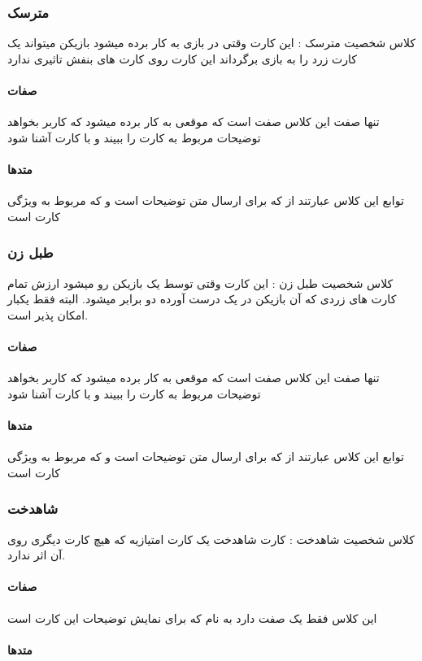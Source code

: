 \documentclass[pdf,titlepage,a4paper]{report}
\begin{document}
	\subsubsection{مترسک}
	کلاس شخصیت مترسک : این کارت وقتی در بازی به کار برده میشود بازیکن میتواند یک کارت زرد را به بازی برگرداند 
	این کارت روی کارت های بنفش تاثیری ندارد
	\paragraph{صفات}
	 تنها  صفت این کلاس صفت   است که موقعی به کار برده میشود که کاربر بخواهد توضیحات مربوط به کارت را ببیند و با کارت آشنا شود
	 
	 \paragraph{متدها}
	 توابع این کلاس عبارتند از  
	  که برای ارسال متن توضیحات است 
	 و  که مربوط به ویژگی کارت است
	\subsubsection{طبل زن}
	 کلاس شخصیت طبل زن : این کارت وقتی توسط یک بازیکن رو میشود ارزش تمام کارت های زردی که آن بازیکن در یک درست آورده دو برابر میشود. البته فقط یکبار امکان پذیر است.

    \paragraph{صفات}
	تنها  صفت این کلاس صفت   است که موقعی به کار برده میشود که کاربر بخواهد توضیحات مربوط به کارت را ببیند و با کارت آشنا شود
	\paragraph{متدها}
	توابع این کلاس عبارتند از  
	 که برای ارسال متن توضیحات است 
	و  که مربوط به ویژگی کارت است
	\subsubsection{شاهدخت}
	 کلاس شخصیت شاهدخت : کارت شاهدخت یک کارت امتیازیه که هیچ کارت دیگری روی آن اثر ندارد.
	\paragraph{صفات}
	این کلاس فقط یک صفت دارد به نام   که برای نمایش توضیحات این کارت است
	\paragraph{متدها}
\end{document}
